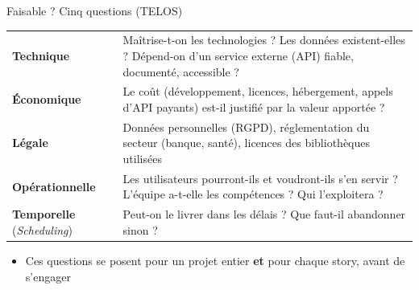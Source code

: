 \documentclass[aspectratio=169,10pt]{beamer}
\begin{document}
\begin{frame}{Faisable ? Cinq questions (TELOS)}
  \small
  \begin{datacard}
    \begin{tabular}{@{}p{2.6cm}p{10.2cm}@{}}
      \toprule
      \textbf{\color{qaaccent}Technique} & Maîtrise-t-on les technologies ? Les données existent-elles ? Dépend-on d'un service externe (API) fiable, documenté, accessible ? \\
      \textbf{\color{qaaccent}Économique} & Le coût (développement, licences, hébergement, appels d'API payants) est-il justifié par la valeur apportée ? \\
      \textbf{\color{qaaccent}Légale} & Données personnelles (RGPD), réglementation du secteur (banque, santé), licences des bibliothèques utilisées \\
      \textbf{\color{qaaccent}Opérationnelle} & Les utilisateurs pourront-ils et voudront-ils s'en servir ? L'équipe a-t-elle les compétences ? Qui l'exploitera ? \\
      \textbf{\color{qaaccent}Temporelle} (\textit{Scheduling}) & Peut-on le livrer dans les délais ? Que faut-il abandonner sinon ? \\
      \bottomrule
    \end{tabular}
  \end{datacard}
  \vspace{2mm}
  \begin{itemize}
    \item Ces questions se posent pour un projet entier \textbf{et} pour chaque story, avant de s'engager
  \end{itemize}
\end{frame}
\end{document}
